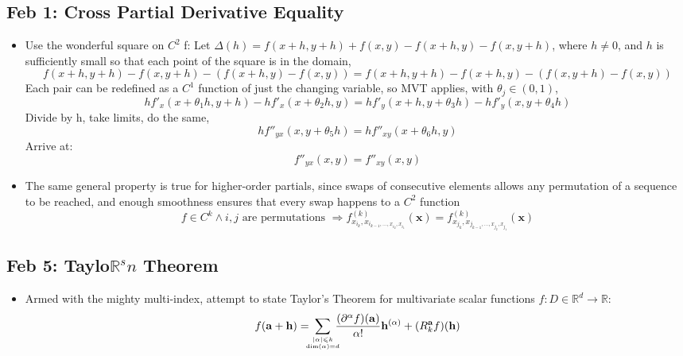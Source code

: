 \documentclass[10pt, oneside]{article}
\newcommand{\del}{\partial}
\newcommand{\stack}[2]{\genfrac{}{}{0pt}{}{#1}{#2}}
\let\leq\leqslant
\newcommand{\R}{\mathbb{R}}
\renewcommand{\vec}[1]{\mathbf{#1}}
\begin{document}
\subsection{Feb 1: Cross Partial Derivative Equality}
\begin{itemize}
    \item Use the wonderful square on $C^2$ f: Let $\Delta(h) = f(x+h,y+h) + f(x,y) - f(x+h,y) - f(x,y+h)$, where $h \neq 0$, and $h$ is sufficiently small so that each point of the square is in the domain,
        \[f(x+h,y+h) - f(x,y+h) - (f(x+h,y) - f(x,y)) = f(x+h,y+h) - f(x+h,y) - (f(x,y+h) - f(x,y))\]
        Each pair can be redefined as a $C^1$ function of just the changing variable, so MVT applies, with $\theta_j \in (0,1)$,
        \[h f'_x(x+\theta_1h,y+h) - h f'_x(x+\theta_2h,y) = h f'_y(x+h,y+\theta_3h) - h f'_y(x,y+\theta_4h)\]
        Divide by h, take limits, do the same,
        \[h f''_{yx} (x,y+\theta_5h) = h f''_{xy} (x+\theta_6h,y)\]
        Arrive at:
        \[f''_{yx} (x,y) = f''_{xy} (x,y)\]
    \item The same general property is true for higher-order partials, since swaps of consecutive elements allows any permutation of a sequence to be reached, and enough smoothness ensures that every swap happens to a $C^2$ function
        \[f \in C^k \land i,j \text{ are permutations } \Rightarrow f^{(k)}_{x_{i_k},x_{i_{k-1},\hdots,x_{i_2},x_{i_1}}} (\vec{x}) = f^{(k)}_{x_{j_k},x_{j_{k-1},\hdots,x_{j_2},x_{j_1}}} (\vec{x})\]
\end{itemize}

\subsection{Feb 5: Taylo$\R^sn$ Theorem}
\begin{itemize}
    \item Armed with the mighty multi-index, attempt to state Taylor's Theorem for multivariate scalar functions $f:D \in \R^d \rightarrow \R$:
        \[f(\vec{a} + \vec{h}) = \! \! \! \! \sum_{\stack{|\alpha| \leq k}{\dim(\alpha) = d}} \! \! \! \! \frac{(\del^\alpha f)(\vec{a})}{\alpha!} \vec{h}^{(\alpha)} + (R^\vec{a}_k f)(\vec{h})\]
\end{itemize}
\end{document}
